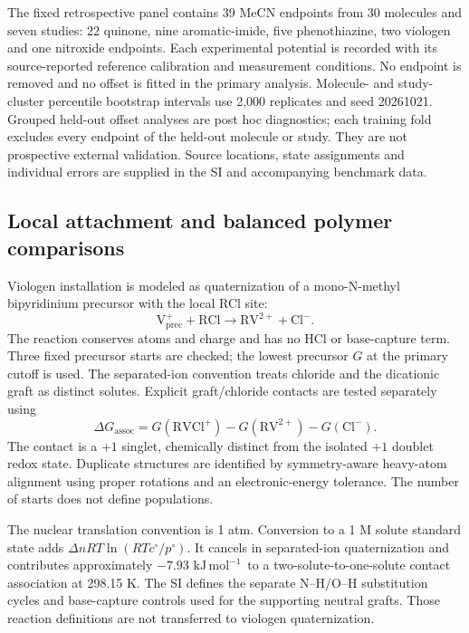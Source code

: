 \documentclass[11pt]{article}
\newcommand{\kj}{\ensuremath{\mathrm{kJ\,mol^{-1}}}}
\begin{document}
The fixed retrospective panel contains 39 MeCN endpoints from 30 molecules and seven studies: 22 quinone, nine aromatic-imide, five phenothiazine, two viologen and one nitroxide endpoints. Each experimental potential is recorded with its source-reported reference calibration and measurement conditions. No endpoint is removed and no offset is fitted in the primary analysis. Molecule- and study-cluster percentile bootstrap intervals use 2,000 replicates and seed 20261021. Grouped held-out offset analyses are post hoc diagnostics; each training fold excludes every endpoint of the held-out molecule or study. They are not prospective external validation. Source locations, state assignments and individual errors are supplied in the SI and accompanying benchmark data.

\subsection{Local attachment and balanced polymer comparisons}
Viologen installation is modeled as quaternization of a mono-N-methyl bipyridinium precursor with the local RCl site:
\begin{equation}
\mathrm{V_{prec}^++RCl\rightarrow RV^{2+}+Cl^-}.
\label{eq:quaternization}
\end{equation}
The reaction conserves atoms and charge and has no HCl or base-capture term. Three fixed precursor starts are checked; the lowest precursor $G$ at the primary cutoff is used. The separated-ion convention treats chloride and the dicationic graft as distinct solutes. Explicit graft/chloride contacts are tested separately using
\begin{equation}
\Delta G_{\mathrm{assoc}}=G(\mathrm{RVCl^+})-G(\mathrm{RV^{2+}})-G(\mathrm{Cl^-}).
\end{equation}
The contact is a $+1$ singlet, chemically distinct from the isolated $+1$ doublet redox state. Duplicate structures are identified by symmetry-aware heavy-atom alignment using proper rotations and an electronic-energy tolerance. The number of starts does not define populations.

The nuclear translation convention is 1 atm. Conversion to a 1 M solute standard state adds $\Delta nRT\ln(RTc^\circ/p^\circ)$. It cancels in separated-ion quaternization and contributes approximately $-7.93$ \kj\ to a two-solute-to-one-solute contact association at 298.15 K. The SI defines the separate N--H/O--H substitution cycles and base-capture controls used for the supporting neutral grafts. Those reaction definitions are not transferred to viologen quaternization.
\end{document}
